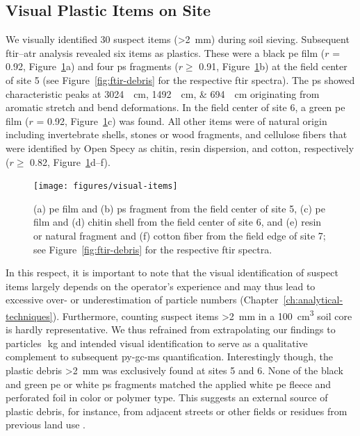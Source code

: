 \subsection{Visual Plastic Items on Site}

We visually identified 30 suspect items (\SI{>2}{\milli\meter}) during soil sieving. Subsequent \ac{ftir}--\ac{atr} analysis revealed six items as plastics. These were a black \ac{pe} film ($r$ = 0.92, Figure~\ref{fig:visual-items}a) and four \ac{ps} fragments ($r \geq$ 0.91, Figure~\ref{fig:visual-items}b) at the field center of site 5 (see Figure~\ref{fig:ftir-debris} for the respective \ac{ftir} spectra). The \ac{ps} showed characteristic peaks at \SIlist{3024;1492;694}{\per\centi\meter} originating from aromatic  stretch and bend deformations. In the field center of site 6, a green \ac{pe} film ($r$ = 0.92, Figure~\ref{fig:visual-items}c) was found. All other items were of natural origin including invertebrate shells, stones or wood fragments, and cellulose fibers that were identified by Open Specy as chitin, resin dispersion, and cotton, respectively ($r \geq$ 0.82, Figure~\ref{fig:visual-items}d--f).

\begin{figure}
	\centering
	\texttt{[image: figures/visual-items]}
	\caption[Exemplary photographs of suspect particles \SI{>2}{\milli\meter}.]{(a) \ac{pe} film and (b) \ac{ps} fragment from the field center of site 5, (c) \ac{pe} film and (d) chitin shell from the field center of site 6, and (e) resin or natural fragment and (f) cotton fiber from the field edge of site 7; see Figure~\protect\ref{fig:ftir-debris} for the respective \ac{ftir} spectra.}
	\label{fig:visual-items}
\end{figure}

In this respect, it is important to note that the visual identification of suspect items largely depends on the operator's experience and may thus lead to excessive over- or underestimation of particle numbers (Chapter~\ref{ch:analytical-techniques}). Furthermore, counting suspect items \SI{>2}{\milli\meter} in a \SI{100}{\cubic\centi\meter} soil core is hardly representative. We thus refrained from extrapolating our findings to particles\,\si{\per\kilo\gram} and intended visual identification to serve as a qualitative complement to subsequent \ac{py-gc-ms} quantification.
Interestingly though, the plastic debris \SI{>2}{\milli\meter} was exclusively found at sites 5 and 6. None of the black and green \ac{pe} or white \ac{ps} fragments matched the applied white \ac{pe} fleece and perforated foil in color or polymer type. This suggests an external source of plastic debris, for instance, from adjacent streets or other fields or residues from previous land use \citep{HarmsAmount2021}.

